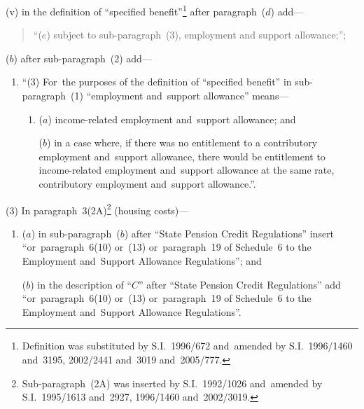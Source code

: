 \documentclass[12pt,a4paper]{article}
\begin{document}
\begin{enumerate}
\begin{enumerate}
(v) in the definition of “specified benefit”\footnote{Definition was substituted by S.I.~1996/672 and~amended by S.I.~1996/1460 and~3195, 2002/2441 and~3019 and~2005/777.} after paragraph~($d$)  add—
\begin{quotation}
“($e$) subject to sub-paragraph~(3), employment and support allowance;”;
\end{quotation}
\end{enumerate}

($b$) after sub-paragraph~(2) add—
\begin{enumerate}\item[]
“(3) For~the purposes of the definition of “specified benefit” in sub-paragraph~(1) “employment and~support allowance” means—
\begin{enumerate}\item[]
($a$) income-related employment and~support allowance; and

($b$) in a case where, if there was no entitlement to a contributory employment and~support allowance, there would be entitlement to income-related employment and~support allowance at the same rate, contributory employment and~support allowance.”.
\end{enumerate}
\end{enumerate}
\end{enumerate}

(3) In paragraph~3(2A)\footnote{Sub-paragraph~(2A) was inserted by S.I.~1992/1026 and~amended by S.I.~1995/1613 and~2927, 1996/1460 and~2002/3019.} (housing costs)—
\begin{enumerate}\item[]
($a$) in sub-paragraph~($b$)  after “State Pension Credit Regulations” insert “or~paragraph~6(10) or~(13) or~paragraph~19 of Schedule~6 to the Employment and~Support Allowance Regulations”; and

($b$) in the description of “$C$” after “State Pension Credit Regulations” add “or~paragraph~6(10) or~(13) or~paragraph~19 of Schedule~6 to the Employment and~Support Allowance Regulations”.
\end{enumerate}
\end{document}
